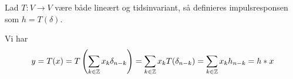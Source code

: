 \begin{definition}
Lad $T: V \to V$ være både lineært og tidsinvariant, så definieres impulsresponsen som $h = T(\delta)$.
\end{definition}
\begin{remark}
  Vi har
  \begin{equation*}
    y = T(x) =  T\left(\sum_{k\in \mathbb{Z}} x_{k} \delta_{n - k}\right) = \sum_{k\in \mathbb{Z}} x_{k} T(\delta_{n - k}) = \sum_{k\in\mathbb{Z}} x_{k} h_{n -k} = h * x
  \end{equation*}
\end{remark}
